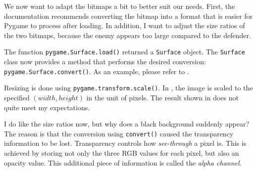 
We now want to adapt the bitmaps a bit to better suit our needs. First, the documentation recommends converting the bitmap into a format that is easier for Pygame to process after loading.
In addition, I want to adjust the size ratios of the two bitmaps, because the enemy appears too large compared to the defender.


\begin{figure}%
    \vspace{-1em}%
\end{figure}%
The function \texttt{pygame.Surface.load()} returned a \texttt{Surface} object. The \texttt{Surface} class now provides a method that performs the desired conversion: \texttt{pygame.Surface\-.convert()}. As an example, please refer to .\label{pageTransparenz}
 
Resizing is done using \texttt{pygame\-.trans\-form\-.scale()}. In , the image is scaled to the specified $(width, height)$ in the unit of pixels. The result shown in  does not quite meet my
expectations.

I do like the size ratios now, but why does a black background suddenly appear? The reason is that the conversion using \texttt{convert()} caused the transparency information to be lost. Transparency controls how \emph{see-through} a pixel is. This is achieved by storing not only the three RGB values for each
pixel, but also an opacity value. This additional piece of information is called the
\emph{alpha channel}.

